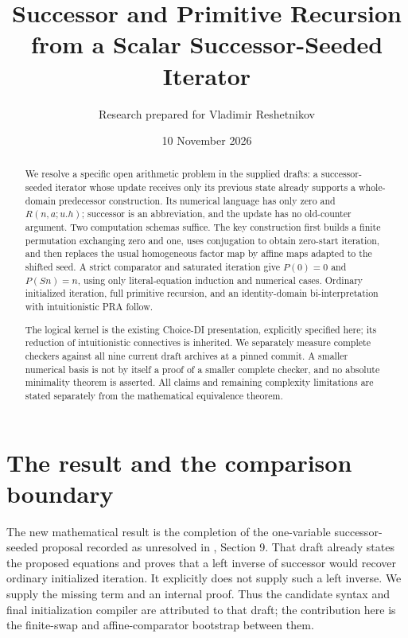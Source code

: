 \documentclass[11pt,letterpaper]{article}
\title{Successor and Primitive Recursion\\from a Scalar Successor-Seeded Iterator}
\author{Research prepared for Vladimir Reshetnikov}
\date{10 November 2026}
\theoremstyle{definition}\newtheorem{definition}[theorem]{Definition}
\theoremstyle{remark}\newtheorem{remark}[theorem]{Remark}
\newcommand{\file}[1]{\texttt{\detokenize{#1}}}
\begin{document}
\maketitle
\begin{abstract}
We resolve a specific open arithmetic problem in the supplied drafts: a
successor-seeded iterator whose update receives only its previous state
already supports a whole-domain predecessor construction. Its numerical
language has only zero and $R(n,a;u.h)$; successor is an abbreviation, and
the update has no old-counter argument. Two computation schemas suffice.
The key construction first builds a finite permutation exchanging zero
and one, uses conjugation to obtain zero-start iteration, and then replaces
the usual homogeneous factor map by affine maps adapted to the shifted
seed. A strict comparator and saturated iteration give
$P(0)=0$ and $P(Sn)=n$, using only literal-equation induction and numerical
cases. Ordinary initialized iteration, full primitive recursion, and an
identity-domain bi-interpretation with intuitionistic PRA follow.

The logical kernel is the existing Choice-DI presentation, explicitly
specified here; its reduction of intuitionistic connectives is inherited.
We separately measure complete checkers against all nine current draft
archives at a pinned commit. A smaller numerical basis is not by itself
a proof of a smaller complete checker, and no absolute minimality theorem
is asserted. All claims and remaining complexity limitations are stated
separately from the mathematical equivalence theorem.
\end{abstract}
\begingroup
\setcounter{tocdepth}{1}
\setlength{\parskip}{0pt}
\tableofcontents
\endgroup
\setcounter{tocdepth}{2}
\newpage

\section{The result and the comparison boundary}

The new mathematical result is the completion of the one-variable
successor-seeded proposal recorded as unresolved in
\file{ipra_shared_continuation_2026-11-10.zip}, Section 9\cite{shared}.
That draft already states the proposed equations and proves that a
left inverse of successor would recover ordinary initialized iteration.
It explicitly does not supply such a left inverse. We supply the missing
term and an internal proof. Thus the candidate syntax and final
initialization compiler are attributed to that draft; the contribution
here is the finite-swap and affine-comparator bootstrap between them.
\end{document}
